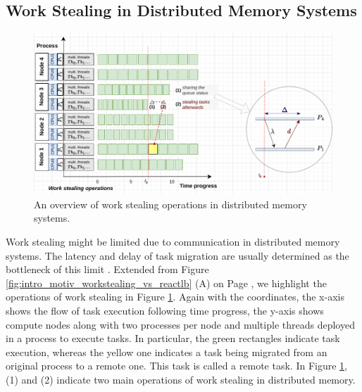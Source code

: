 \subsection{Work Stealing in Distributed Memory Systems}

\begin{figure}[t]
	\centering
	\includegraphics[scale=0.65]{./pictures/preliminaries/preli_workstealing_behavior.pdf}
	\caption{An overview of work stealing operations in distributed memory systems.}
	\label{fig:preli_workstealing_operations}
\end{figure}

Work stealing might be limited due to communication in distributed memory systems. The latency and delay of task migration are usually determined as the bottleneck of this limit \cite{dinan2009scalable}. Extended from Figure \ref{fig:intro_motiv_workstealing_vs_reactlb} (A) on Page \pageref{fig:intro_motiv_workstealing_vs_reactlb}, we highlight the operations of work stealing in Figure \ref{fig:preli_workstealing_operations}. Again with the coordinates, the x-axis shows the flow of task execution following time progress, the y-axis shows compute nodes along with two processes per node and multiple threads deployed in a process to execute tasks. In particular, the green rectangles indicate task execution, whereas the yellow one indicates a task being migrated from an original process to a remote one. This task is called a remote task. In Figure \ref{fig:preli_workstealing_operations}, (1) and (2) indicate two main operations of work stealing in distributed memory.\\

